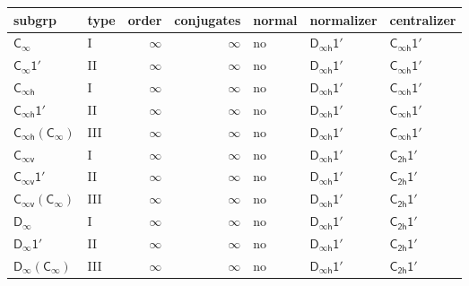 \documentclass[10pt,a4paper]{article}
\numberwithin{equation}{section}
\newcommand{\grp}[1]{\mathsf{#1}}
\begin{document}
{\small\begin{longtable}{@{}llrrlll@{}}\toprule
subgrp & type & order & conjugates & normal & normalizer & centralizer\\\midrule\endhead
\bottomrule\endfoot\endlastfoot
\href{../../../rotation/data/pdf/Cinf.pdf}{$\grp{C_{\infty}}$} & I & $\infty$ & $\infty$ & no & \href{Dinfh-1p.pdf}{$\grp{D_{\infty h}1'}$} & \href{Cinfh-1p.pdf}{$\grp{C_{\infty h}1'}$}\\*
\href{Cinf-1p.pdf}{$\grp{C_{\infty}1'}$} & II & $\infty$ & $\infty$ & no & \href{Dinfh-1p.pdf}{$\grp{D_{\infty h}1'}$} & \href{Cinfh-1p.pdf}{$\grp{C_{\infty h}1'}$}\\
\href{../../../rotation/data/pdf/Cinfh.pdf}{$\grp{C_{\infty h}}$} & I & $\infty$ & $\infty$ & no & \href{Dinfh-1p.pdf}{$\grp{D_{\infty h}1'}$} & \href{Cinfh-1p.pdf}{$\grp{C_{\infty h}1'}$}\\
\href{Cinfh-1p.pdf}{$\grp{C_{\infty h}1'}$} & II & $\infty$ & $\infty$ & no & \href{Dinfh-1p.pdf}{$\grp{D_{\infty h}1'}$} & \href{Cinfh-1p.pdf}{$\grp{C_{\infty h}1'}$}\\
\href{Cinfh-Cinf.pdf}{$\grp{C_{\infty h}}(\grp{C_{\infty}})$} & III & $\infty$ & $\infty$ & no & \href{Dinfh-1p.pdf}{$\grp{D_{\infty h}1'}$} & \href{Cinfh-1p.pdf}{$\grp{C_{\infty h}1'}$}\\
\href{../../../rotation/data/pdf/Cinfv.pdf}{$\grp{C_{\infty v}}$} & I & $\infty$ & $\infty$ & no & \href{Dinfh-1p.pdf}{$\grp{D_{\infty h}1'}$} & \href{C2h-1p.pdf}{$\grp{C_{2h}1'}$}\\
\href{Cinfv-1p.pdf}{$\grp{C_{\infty v}1'}$} & II & $\infty$ & $\infty$ & no & \href{Dinfh-1p.pdf}{$\grp{D_{\infty h}1'}$} & \href{C2h-1p.pdf}{$\grp{C_{2h}1'}$}\\
\href{Cinfv-Cinf.pdf}{$\grp{C_{\infty v}}(\grp{C_{\infty}})$} & III & $\infty$ & $\infty$ & no & \href{Dinfh-1p.pdf}{$\grp{D_{\infty h}1'}$} & \href{C2h-1p.pdf}{$\grp{C_{2h}1'}$}\\
\href{../../../rotation/data/pdf/Dinf.pdf}{$\grp{D_{\infty}}$} & I & $\infty$ & $\infty$ & no & \href{Dinfh-1p.pdf}{$\grp{D_{\infty h}1'}$} & \href{C2h-1p.pdf}{$\grp{C_{2h}1'}$}\\
\href{Dinf-1p.pdf}{$\grp{D_{\infty}1'}$} & II & $\infty$ & $\infty$ & no & \href{Dinfh-1p.pdf}{$\grp{D_{\infty h}1'}$} & \href{C2h-1p.pdf}{$\grp{C_{2h}1'}$}\\
\href{Dinf-Cinf.pdf}{$\grp{D_{\infty}}(\grp{C_{\infty}})$} & III & $\infty$ & $\infty$ & no & \href{Dinfh-1p.pdf}{$\grp{D_{\infty h}1'}$} & \href{C2h-1p.pdf}{$\grp{C_{2h}1'}$}\\

\end{longtable}}
\end{document}
